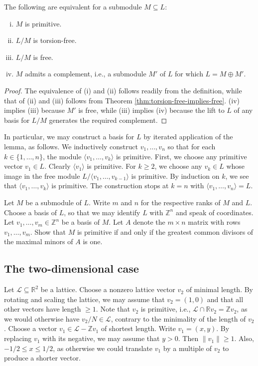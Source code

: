 \documentclass[reqno]{amsart} 
\begin{document}
\begin{lemma}
  The following are equivalent for a submodule $M \subseteq L$:
  \begin{enumerate}
    [(i)]
  \item $M$ is primitive.
  \item $L/M$ is torsion-free.
  \item $L/M$ is free.
  \item $M$ admits a complement, i.e., a submodule $M'$ of $L$ for which $L = M \oplus M'$.
  \end{enumerate}
\end{lemma}
\begin{proof}
  The equivalence of (i) and (ii) follows readily from the definition, while that of (ii) and (iii) follows from Theorem \ref{thm:torsion-free-implies-free}.  (iv) implies (iii) because $M'$ is free, while (iii) implies (iv) because the lift to $L$ of any basis for $L/M$ generates the required complement.
\end{proof}

In particular, we may construct a basis for $L$ by iterated application of the lemma, as follows.  We inductively construct $v_1,\dotsc,v_n$ so that for each $k \in \{1, \dotsc, n\}$, the module $\langle v_1,\dotsc,v_k \rangle$ is primitive.  First, we choose any primitive vector $v_1 \in L$.  Clearly $\langle v_1 \rangle$ is primitive.  For $k \geq 2$, we choose any $v_k \in L$ whose image in the free module $L / \langle v_1,\dotsc, v_{k-1} \rangle$ is primitive.  By induction on $k$, we see that $\langle v_1, \dotsc, v_k \rangle$ is primitive.  The construction stops at $k=n$ with $\langle v_1, \dotsc, v_n \rangle = L$.

\begin{exercise}
  Let $M$ be a submodule of $L$.  Write $m$ and $n$ for the respective ranks of $M$ and $L$.  Choose a basis of $L$, so that we may identify $L$ with $\mathbb{Z}^n$ and speak of coordinates.  Let $v_1,\dotsc,v_m \in \mathbb{Z}^n$ be a basis of $M$.  Let $A$ denote the $m \times n$ matrix with rows $v_1,\dotsc,v_m$.  Show that $M$ is primitive if and only if the greatest common divisors of the maximal minors of $A$ is one.
\end{exercise}

\subsection{The two-dimensional case}
\label{sec:org729f490}
Let $\mathcal{L} \subseteq \mathbb{R}^2$ be a lattice.  Choose a nonzero lattice vector $v_2$ of minimal length.  By rotating and scaling the lattice, we may assume that $v_2 = (1,0)$ and that all other vectors have length $\geq 1$.  Note that $v_2$ is primitive, i.e., $\mathcal{L} \cap \mathbb{R} v_2 = \mathbb{Z} v_2$, as we would otherwise have $v_2/N \in \mathcal{L}$, contrary to the minimality of the length of $v_2$.  Choose a vector $v_1 \in \mathcal{L} - \mathbb{Z} v_1$ of shortest length.  Write $v_1 = (x,y)$.  By replacing $v_1$ with its negative, we may assume that $y > 0$.  Then $\|v_1\| \geq 1$.  Also, $-1/2 \leq x \leq 1/2$, as otherwise we could translate $v_1$ by a multiple of $v_2$ to produce a shorter vector.
\end{document}
